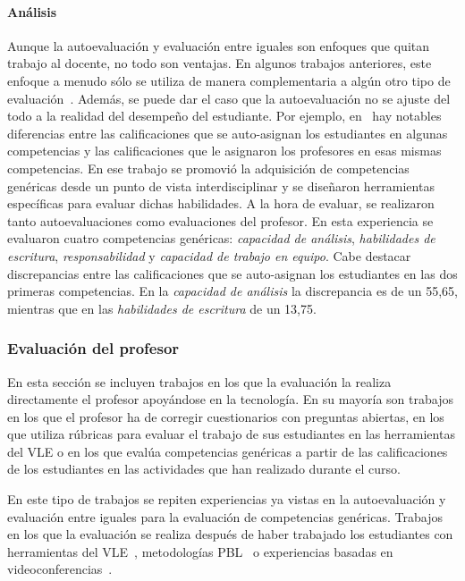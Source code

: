 \paragraph*{Análisis}
Aunque la autoevaluación y evaluación entre iguales son enfoques que quitan trabajo al docente, no todo son ventajas. En algunos trabajos anteriores, este enfoque a menudo sólo se utiliza de manera complementaria a algún otro tipo de evaluación~\cite{lasa2013problem,sevilla2012assessment}. Además, se puede dar el caso que la autoevaluación no se ajuste del todo a la realidad del desempeño del estudiante. Por ejemplo, en~\cite{carreras2013promotion} hay notables diferencias entre las calificaciones que se auto-asignan los estudiantes en algunas competencias y las calificaciones que le asignaron los profesores en esas mismas competencias. En ese trabajo se promovió la adquisición de competencias genéricas desde un punto de vista interdisciplinar y se diseñaron herramientas específicas para evaluar dichas habilidades. A la hora de evaluar, se realizaron tanto autoevaluaciones como evaluaciones del profesor. En esta experiencia se evaluaron cuatro competencias genéricas: \emph{capacidad de análisis},  \emph{habilidades de escritura}, \emph{responsabilidad} y \emph{capacidad de trabajo en equipo}. Cabe destacar discrepancias entre las calificaciones que se auto-asignan los estudiantes en las dos primeras competencias. En la \emph{capacidad de análisis} la discrepancia es de un 55,65\percentage, mientras que en las \emph{habilidades de escritura} de un 13,75\percentage.


\subsubsection{Evaluación del profesor}

En esta sección se incluyen trabajos en los que la evaluación la realiza directamente el profesor apoyándose en la tecnología. En su mayoría son trabajos en los que el profesor ha de corregir cuestionarios con preguntas abiertas, en los que utiliza rúbricas para evaluar el trabajo de sus estudiantes en las herramientas del VLE o en los que evalúa competencias genéricas a partir de las calificaciones de los estudiantes en las actividades que han realizado durante el curso. 

En este tipo de trabajos se repiten experiencias ya vistas en la autoevaluación y evaluación entre iguales para la evaluación de competencias genéricas. Trabajos en los que la evaluación se realiza después de haber trabajado los estudiantes con herramientas del VLE~\cite{starcic2008sustaining}, metodologías PBL~\cite{lacuesta2009active} o experiencias basadas en videoconferencias~\cite{ward2011developing}.

